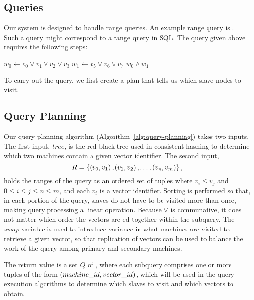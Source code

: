 \subsection{Queries}
Our system is designed to handle range queries. An example range query is
. Such a query might correspond to a range query in SQL.
The query given above requires the following steps:
\begin{algorithmic}
    \State $w_0 \gets v_0 \lor v_1 \lor v_2 \lor v_3$
    \State $w_1 \gets v_5 \lor v_6 \lor v_7$
    \State \Return $w_0 \land w_1$
\end{algorithmic}
To carry out the query, we first create a plan that tells us which slave nodes
to visit.
\subsection{Query Planning}
Our query planning algorithm (Algorithm~\ref{alg:query-planning}) takes two
inputs. The first input, \(tree\), is the red-black tree used in consistent
hashing to determine which two machines contain a given vector identifier. The
second input,
\[R = \left\{\left(v_0, v_1\right), \left(v_1, v_2\right), \ldots, \left(v_n, v_m\right)\right\},\]
holds the ranges of the query as an ordered set of tuples where
\(v_i \leq v_j\) and \(0 \leq i \leq j \leq n \leq m\), and each \(v_i\) is a
vector identifier. Sorting is performed so that, in each portion of the query,
slaves do not have to be visited more than once, making query processing
a linear operation. Because \(\lor\) is communative, it does not matter which
order the vectors are ed together within the subquery. The \(swap\)
variable is used to introduce variance in what machines are visited to retrieve
a given vector, so that replication of vectors can be used to balance the work
of the query among primary and secondary machines.
\par
The return value is a set $Q$ of , where each subquery
comprises one or more tuples of the form \(\left(machine\_id,vector\_id\right)\),
which will be used in the query execution algorithms to determine which slaves
to visit and which vectors to obtain.
%
